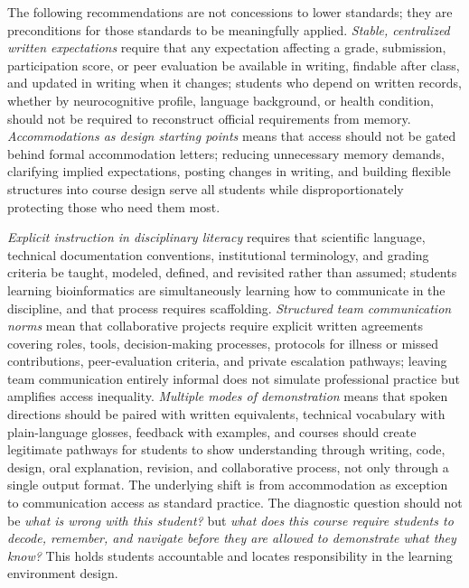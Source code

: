 \documentclass[11pt]{article}
\begin{document}
The following recommendations are not concessions to lower standards; they are preconditions for those standards to be meaningfully applied. \textit{Stable, centralized written expectations} require that any expectation affecting a grade, submission, participation score, or peer evaluation be available in writing, findable after class, and updated in writing when it changes; students who depend on written records, whether by neurocognitive profile, language background, or health condition, should not be required to reconstruct official requirements from memory. \textit{Accommodations as design starting points} means that access should not be gated behind formal accommodation letters; reducing unnecessary memory demands, clarifying implied expectations, posting changes in writing, and building flexible structures into course design serve all students while disproportionately protecting those who need them most.

\textit{Explicit instruction in disciplinary literacy} requires that scientific language, technical documentation conventions, institutional terminology, and grading criteria be taught, modeled, defined, and revisited rather than assumed; students learning bioinformatics are simultaneously learning how to communicate in the discipline, and that process requires scaffolding. \textit{Structured team communication norms} mean that collaborative projects require explicit written agreements covering roles, tools, decision-making processes, protocols for illness or missed contributions, peer-evaluation criteria, and private escalation pathways; leaving team communication entirely informal does not simulate professional practice but amplifies access inequality. \textit{Multiple modes of demonstration} means that spoken directions should be paired with written equivalents, technical vocabulary with plain-language glosses, feedback with examples, and courses should create legitimate pathways for students to show understanding through writing, code, design, oral explanation, revision, and collaborative process, not only through a single output format. The underlying shift is from accommodation as exception to communication access as standard practice. The diagnostic question should not be \textit{what is wrong with this student?} but \textit{what does this course require students to decode, remember, and navigate before they are allowed to demonstrate what they know?} This holds students accountable and locates responsibility in the learning environment design.
\vspace{-2.5em}
\end{document}
